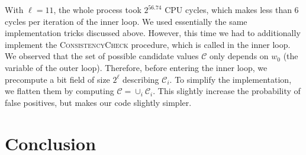 \documentclass[submission,svgnames,journal=tosc]{iacrtrans}
\begin{document}
With $\ell=11$, the whole process took $2^{56.74}$ CPU cycles, which makes less
than 6 cycles per iteration of the inner loop. We used essentially the same
implementation tricks discussed above. However, this time we had to additionally
implement the \textsc{ConsistencyCheck} procedure, which is called in the inner
loop. We observed that the set of possible candidate values $\mathcal{C}$ only
depends on $w_0$ (the variable of the outer loop). Therefore, before entering
the inner loop, we precompute a bit field of size $2^\ell$ describing
$\mathcal{C}_i$. To simplify the implementation, we flatten them by computing
$\mathcal{C} = \cup_i \mathcal{C}_i$. This slightly increase the probability of
false positives, but makes our code slightly simpler.

\section{Conclusion}





\end{document}

